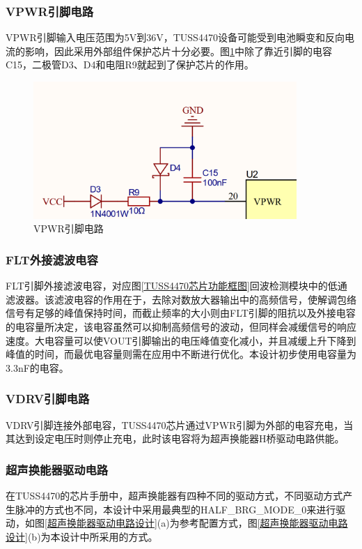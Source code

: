     \subsubsection{VPWR引脚电路}
    VPWR引脚输入电压范围为5V到36V，TUSS4470设备可能受到电池瞬变和反向电流的影响，因此采用外部组件保护芯片十分必要。图\ref{VPWR引脚}中除了靠近引脚的电容C15，二极管D3、D4和电阻R9就起到了保护芯片的作用。
     \begin{figure}[ht]
    	\centering
    	\includegraphics[width=10cm]{figure/VPWR PIN.png}
    	\caption{VPWR引脚电路}
    	\label{VPWR引脚}
    \end{figure}
    
    \subsubsection{FLT外接滤波电容}
    FLT引脚外接滤波电容，对应图\ref{TUSS4470芯片功能框图}回波检测模块中的低通滤波器。该滤波电容的作用在于，去除对数放大器输出中的高频信号，使解调包络信号有足够的峰值保持时间，而截止频率的大小则由FLT引脚的阻抗以及外接电容的电容量所决定，该电容虽然可以抑制高频信号的波动，但同样会减缓信号的响应速度。大电容量可以使VOUT引脚输出的电压峰值变化减小，并且减缓上升下降到峰值的时间，而最优电容量则需在应用中不断进行优化。本设计初步使用电容量为3.3nF的电容。
    \subsubsection{VDRV引脚电路}
    
    VDRV引脚连接外部电容，TUSS4470芯片通过VPWR引脚为外部的电容充电，当其达到设定电压时则停止充电，此时该电容将为超声换能器H桥驱动电路供能。
     \subsubsection{超声换能器驱动电路}
    在TUSS4470的芯片手册中，超声换能器有四种不同的驱动方式，不同驱动方式产生脉冲的方式也不同，本设计中采用最典型的HALF\_BRG\_MODE\_0来进行驱动，如图\ref{超声换能器驱动电路设计}(a)为参考配置方式，图\ref{超声换能器驱动电路设计}(b)为本设计中所采用的方式。
    
